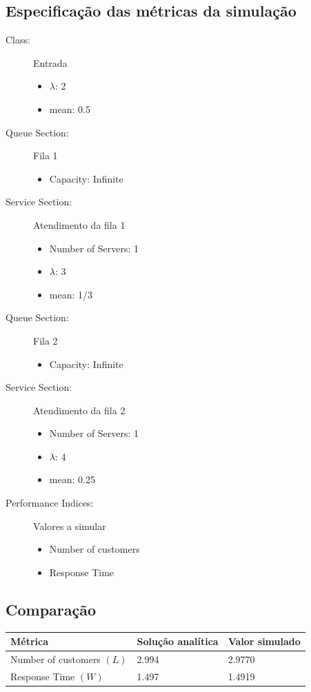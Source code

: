\documentclass[12pt,a4paper]{article}
\begin{document}
\subsection{Especificação das métricas da simulação}
\begin{description}
	\item[Class:] Entrada 
	\begin{itemize}
		\item $\lambda$: 2
		\item mean: 0.5
	\end{itemize}
	\item[Queue Section:] Fila 1
	\begin{itemize}
		\item Capacity: Infinite
	\end{itemize}
	\item[Service Section:] Atendimento da fila 1
	\begin{itemize}
		\item Number of Servers: 1
		\item $\lambda$: 3
		\item mean: 1/3
	\end{itemize}
	\item[Queue Section:] Fila 2
	\begin{itemize}
		\item Capacity: Infinite
	\end{itemize}
	\item[Service Section:] Atendimento da fila 2
	\begin{itemize}
		\item Number of Servers: 1
		\item $\lambda$: 4 
		\item mean: 0.25
	\end{itemize}
	\item[Performance Indices:] Valores a simular 
	\begin{itemize}
		\item Number of customers
		\item Response Time
	\end{itemize}
\end{description}

\subsection{Comparação}

\begin{table}[h]
	\centering
	\begin{tabular}{|l|l|l|} 
		\hline
		\textbf{Métrica} & \textbf{Solução analítica} & \textbf{Valor simulado} \\ 
		\hline
		Number of customers \((L)\) & 2.994 &  2.9770 \\
		\hline
		Response Time \((W)\) & 1.497 & 1.4919 \\
		\hline
	\end{tabular}
\end{table}
\end{document}
